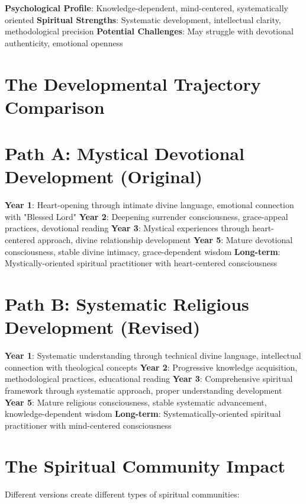 \documentclass[11pt,twoside]{book}
\begin{document}
\textbf{\textbf{Psychological Profile}}: Knowledge-dependent, mind-centered, systematically oriented
\textbf{\textbf{Spiritual Strengths}}: Systematic development, intellectual clarity, methodological precision
\textbf{\textbf{Potential Challenges}}: May struggle with devotional authenticity, emotional openness
\section*{The Developmental Trajectory Comparison}
\label{sec:org0cbb8fa}

\section*{Path A: Mystical Devotional Development (Original)}
\label{sec:org557d229}
\textbf{\textbf{Year 1}}: Heart-opening through intimate divine language, emotional connection with "Blessed Lord"
\textbf{\textbf{Year 2}}: Deepening surrender consciousness, grace-appeal practices, devotional reading
\textbf{\textbf{Year 3}}: Mystical experiences through heart-centered approach, divine relationship development
\textbf{\textbf{Year 5}}: Mature devotional consciousness, stable divine intimacy, grace-dependent wisdom
\textbf{\textbf{Long-term}}: Mystically-oriented spiritual practitioner with heart-centered consciousness
\section*{Path B: Systematic Religious Development (Revised)}
\label{sec:org0092e3c}
\textbf{\textbf{Year 1}}: Systematic understanding through technical divine language, intellectual connection with theological concepts
\textbf{\textbf{Year 2}}: Progressive knowledge acquisition, methodological practices, educational reading
\textbf{\textbf{Year 3}}: Comprehensive spiritual framework through systematic approach, proper understanding development
\textbf{\textbf{Year 5}}: Mature religious consciousness, stable systematic advancement, knowledge-dependent wisdom
\textbf{\textbf{Long-term}}: Systematically-oriented spiritual practitioner with mind-centered consciousness
\section*{The Spiritual Community Impact}
\label{sec:orgec15dc6}

Different versions create different types of spiritual communities:
\end{document}
